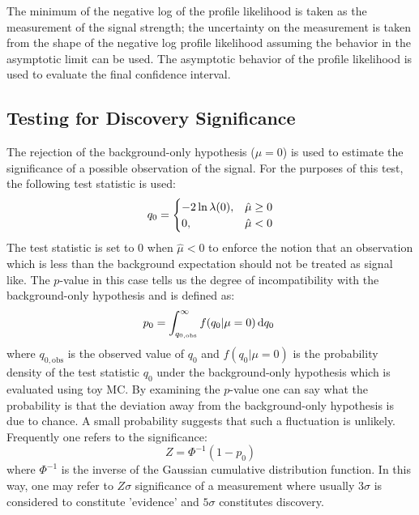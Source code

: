 The minimum of the negative log of the profile likelihood 
is taken as the measurement of the signal strength; 
the uncertainty on the measurement is taken from the shape of the 
negative log profile likelihood assuming the behavior in the asymptotic
limit can be used.  The asymptotic behavior of the profile likelihood 
is used to evaluate the final confidence interval. 


\subsection{Testing for Discovery Significance}
The rejection of the background-only hypothesis ($\mu = 0$) is used 
to estimate the significance of a possible observation of the signal.
For the purposes of this test, the following test 
statistic is used:
\begin{equation}
q_{0} = 
\begin{cases}
\hfill -2 \ln \lambda(0),\hfill & \hat{\mu} \geq 0 \\
0,\hfill & \hat{\mu} < 0
\end{cases}
\label{eq:q0}
\end{equation}
The test statistic is set to $0$ when $\hat{\mu} < 0$ to enforce
the notion that an observation which is less than the background
expectation should not be treated as signal like. The $p$-value in this case
tells us the degree of incompatibility with the background-only hypothesis
and is defined as:
\begin{equation}
p_0=\int^{\infty }_{q_{0,\textrm{obs}}} f(q_0|\mu=0) \mathop{}\!\mathrm{d}q_0~
\label{eq:pvalue}
\end{equation}
where $q_{0,\textrm{obs}}$ is the observed value of $q_0$ and 
$f(q_0|\mu=0)$ is the probability density of the test statistic $q_0$ under
the background-only hypothesis which is evaluated using toy MC. %
By examining the $p$-value one can say what the probability is 
that the deviation away from the background-only hypothesis is due
to chance. A small probability suggests that such a fluctuation is
unlikely. Frequently one refers to the significance:
\begin{equation}
Z = \Phi^{-1}(1-p_0)
\label{eq:significance}
\end{equation}
where $\Phi^{-1}$ is the inverse of the Gaussian cumulative distribution 
function.
In this way, one may refer to $Z\sigma$ significance of a measurement 
where usually
$3\sigma$ is considered to constitute 'evidence' and $5\sigma$ constitutes
discovery.

